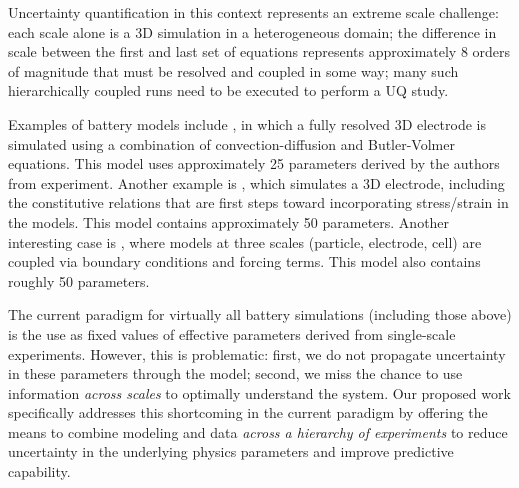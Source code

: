 \documentclass[11pt]{article}
\newcommand{\MarginPar}[1]{\marginpar{%
\vskip-\baselineskip %
\raggedright\tiny\sffamily
\hrule\smallskip{\color{red}#1}\par\smallskip\hrule}}
\begin{document}
Uncertainty quantification in this context represents an
extreme scale challenge:
each scale alone is a 3D simulation in a heterogeneous domain;
the difference in scale between the first and last set of equations represents approximately 8 orders of magnitude that must be resolved and coupled in some way;
many such hierarchically coupled runs need to be executed to perform a UQ study.
  

Examples of battery models include \cite{Less:2012}, in which a fully resolved 3D electrode is simulated using a combination
of convection-diffusion and Butler-Volmer equations. This model uses approximately 25 parameters derived by the authors from experiment.
Another example is \cite{Garcia2005}, which simulates a 3D electrode, including the constitutive relations that are first steps toward
incorporating stress/strain in the models. This model contains approximately 50 parameters.  Another interesting case is \cite{Kim-etal:2011}, where models at three scales (particle, electrode, cell) are coupled via boundary conditions and forcing terms. This model also contains roughly 50 parameters.

The current paradigm for virtually all battery simulations (including those above)
 is the use as fixed values of effective parameters derived from single-scale experiments.  However, this is problematic: first, we do not propagate uncertainty in 
these parameters through the model; second, we miss the chance to use information \emph{across scales} to optimally understand
the system.  Our proposed work specifically addresses this shortcoming in the current paradigm by offering the means to 
combine modeling and data \emph{across a hierarchy of experiments}
to reduce uncertainty in the underlying physics parameters and improve predictive capability.
\end{document}
